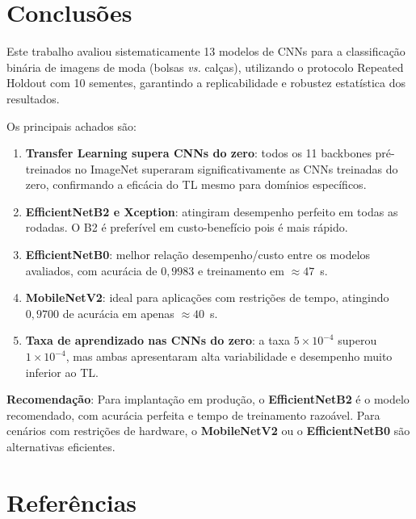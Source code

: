 \documentclass[12pt,a4paper]{article}
\begin{document}
\section{Conclusões}

Este trabalho avaliou sistematicamente 13 modelos de CNNs para a classificação binária
de imagens de moda (bolsas \emph{vs.} calças), utilizando o protocolo Repeated Holdout
com 10 sementes, garantindo a replicabilidade e robustez estatística dos resultados.

Os principais achados são:

\begin{enumerate}
  \item \textbf{Transfer Learning supera CNNs do zero}: todos os 11 backbones
        pré-treinados no ImageNet superaram significativamente as CNNs treinadas
        do zero, confirmando a eficácia do TL mesmo para domínios específicos.

  \item \textbf{EfficientNetB2 e Xception}: atingiram desempenho perfeito em todas
        as rodadas. O B2 é preferível em custo-benefício pois é mais rápido.

  \item \textbf{EfficientNetB0}: melhor relação desempenho/custo entre os modelos
        avaliados, com acurácia de $0{,}9983$ e treinamento em $\approx 47$~s.

  \item \textbf{MobileNetV2}: ideal para aplicações com restrições de tempo,
        atingindo $0{,}9700$ de acurácia em apenas $\approx 40$~s.

  \item \textbf{Taxa de aprendizado nas CNNs do zero}: a taxa $5\times10^{-4}$
        superou $1\times10^{-4}$, mas ambas apresentaram alta variabilidade
        e desempenho muito inferior ao TL.
\end{enumerate}

\textbf{Recomendação}: Para implantação em produção, o \textbf{EfficientNetB2}
é o modelo recomendado, com acurácia perfeita e tempo de treinamento razoável.
Para cenários com restrições de hardware, o \textbf{MobileNetV2} ou o
\textbf{EfficientNetB0} são alternativas eficientes.

\section*{Referências}
\end{document}
